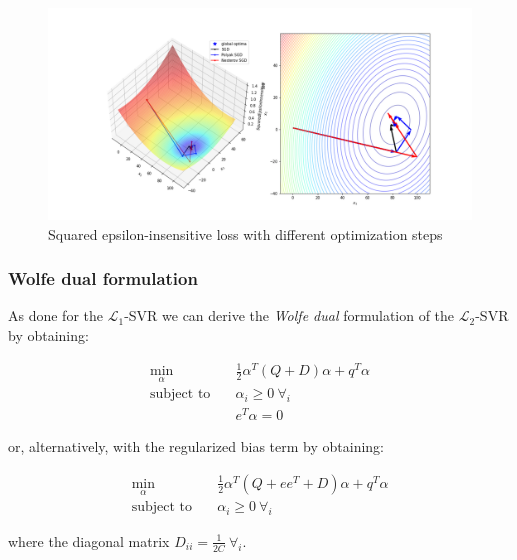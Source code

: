 \begin{figure}[h!]
	\centering
  	\includegraphics[scale=0.4]{img/l2_svr_loss}
  	\caption{Squared epsilon-insensitive loss with different optimization steps}
  	\label{fig:l2_svr_loss}
\end{figure}

\subsubsection{Wolfe dual formulation}

As done for the $\mathcal{L}_1$-SVR we can derive the \emph{Wolfe dual} formulation of the $\mathcal{L}_2$-SVR by obtaining:

\begin{equation} \label{eq:wolfe_dual_l2_svr}
    \begin{aligned}
        \min_{\alpha} \quad & \frac{1}{2} \alpha^T (Q + D) \alpha + q^T \alpha \\
            \text{subject to} \quad & \alpha_i \geq 0 \ \forall_i \\ & e^T \alpha=0
    \end{aligned}
\end{equation}

or, alternatively, with the regularized bias term by obtaining:

\begin{equation} \label{eq:reg_bias_wolfe_dual_l2_svr}
    \begin{aligned}
        \min_{\alpha} \quad & \frac{1}{2}\alpha^T (Q + ee^T + D) \alpha + q^T \alpha \\
            \text{subject to} \quad & \alpha_i \geq 0 \ \forall_i
    \end{aligned}
\end{equation}

where the diagonal matrix $\displaystyle D_{ii} = \frac{1}{2C} \ \forall_i$.

